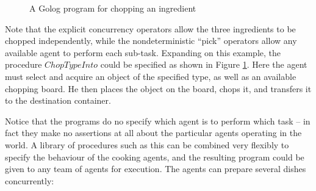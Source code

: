 %
\begin{figure}[!t]
 

\begin{centering}
\par\end{centering}

\caption{A Golog program for chopping an ingredient\label{fig:MIndiGolog:ChopTypeInto}}

\end{figure}


Note that the explicit concurrency operators allow the three ingredients
to be chopped independently, while the nondeterministic {}``pick''
operators allow any available agent to perform each sub-task. Expanding
on this example, the procedure $ChopTypeInto$ could be specified
as shown in Figure \ref{fig:MIndiGolog:ChopTypeInto}. Here the agent
must select and acquire an object of the specified type, as well as
an available chopping board. He then places the object on the board,
chops it, and transfers it to the destination container.

Notice that the programs do no specify which agent is to perform which
task -- in fact they make no assertions at all about the particular
agents operating in the world. A library of procedures such as this
can be combined very flexibly to specify the behaviour of the cooking
agents, and the resulting program could be given to any team of agents
for execution. The agents can prepare several dishes concurrently:

\\



